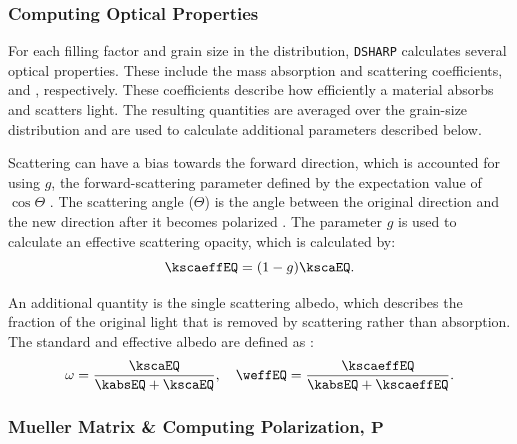 






\subsubsection{Computing Optical Properties}

For each filling factor and grain size in the distribution, \texttt{DSHARP} calculates several optical properties. These include the mass absorption and scattering coefficients, \kabs and \kscaNS, respectively. These coefficients describe how efficiently a material absorbs and scatters light. The resulting quantities are averaged over the grain-size distribution and are used to calculate additional parameters described below. 


Scattering can have a bias towards the forward direction, which is accounted for using $g$, the forward-scattering parameter defined by the expectation value of $\cos\Theta$ \citep{dsharp_code}. The scattering angle ($\Theta$) is the angle between the original direction and the new direction after it becomes polarized \citep{Zhang2023}. The parameter $g$ is used to calculate an effective scattering opacity, which is calculated by:
\begin{equation}
    \kscaeffEQ = (1-g)\kscaEQ.
\end{equation}
 


An additional quantity is the single scattering albedo, which describes the fraction of the original light that is removed by scattering rather than absorption. The standard and effective albedo are defined as \citep{Zhang2023}:
\begin{equation}
    \omega = \frac{\kscaEQ}{\kabsEQ + \kscaEQ}, \quad 
    \weffEQ = \frac{\kscaeffEQ}{\kabsEQ + \kscaeffEQ}.
    \label{eq: omega}
\end{equation}



%








\subsubsection{Mueller Matrix \& Computing Polarization, $\mathbf{P}$ }


